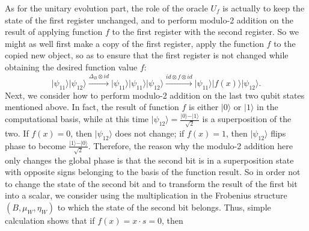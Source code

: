 \documentclass[a4paper,twocolumn,11pt,unpublished]{quantumarticle}
\numberwithin{equation}{section}
\begin{document}
As for the unitary evolution part, the role of the oracle $U_{f}$ is actually to keep the state of the first register unchanged, and to perform modulo-2 addition on the result of applying function $f$ to the first register with the second register. So we might as well first make a copy of the first register, apply the function $f$ to the copied new object, so as to ensure that the first register is not changed while obtaining the desired function value $f$:
$$
\vert \psi_{11} \rangle \vert \psi_{12} \rangle \xrightarrow{\Delta_{B} \otimes id} \vert \psi_{11} \rangle \vert \psi_{11} \rangle \vert \psi_{12} \rangle \xrightarrow{id \otimes f \otimes id}  \vert \psi_{11} \rangle \vert f(x) \rangle \vert \psi_{12} \rangle.
$$
Next, we consider how to perform modulo-2 addition on the last two qubit states mentioned above. In fact, the result of function $f$ is either $\vert 0 \rangle$ or $\vert 1 \rangle$ in the computational basis, while at this time $\vert \psi_{12} \rangle = \frac{\vert 0 \rangle - \vert 1 \rangle}{\sqrt{2}}$ is a superposition of the two. If $f(x)=0$, then $\vert \psi_{12} \rangle$ does not change; if $f(x)=1$, then $\vert \psi_{12} \rangle$ flips phase to become $\frac{\vert 1 \rangle - \vert 0 \rangle}{\sqrt{2}}$. Therefore, the reason why the modulo-2 addition here only changes the global phase is that the second bit is in a superposition state with opposite signs belonging to the basis of the function result. So in order not to change the state of the second bit and to transform the result of the first bit into a scalar, we consider using the multiplication in the Frobenius structure $(B, \mu_{W} ,  \eta_{W})$ to which the state of the second bit belongs. Thus, simple calculation shows that if $f(x) = x \cdot s =0$, then
\end{document}
